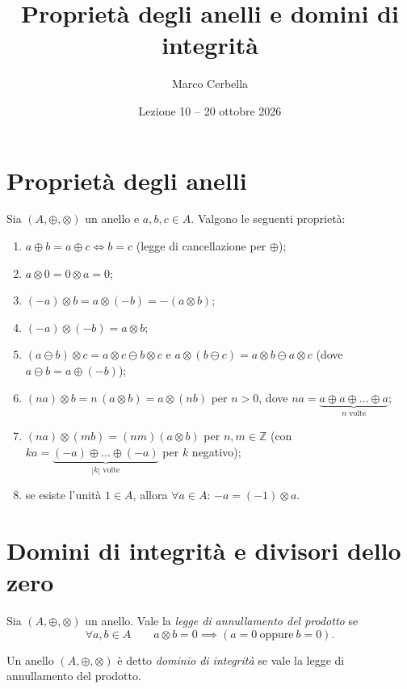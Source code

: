\documentclass[11pt,a4paper]{article}
\title{Proprietà degli anelli e domini di integrità}
\author{Marco Cerbella}
\date{Lezione 10 -- 20 ottobre 2026}
\begin{document}
\maketitle

\section{Proprietà degli anelli}

Sia $(A, \oplus, \otimes)$ un anello e $a, b, c \in A$. Valgono le seguenti proprietà:
\begin{enumerate}
  \item $a \oplus b = a \oplus c \iff b = c$ (legge di cancellazione per $\oplus$);
  \item $a \otimes 0 = 0 \otimes a = 0$;
  \item $(-a)\otimes b = a \otimes (-b) = -(a \otimes b)$;
  \item $(-a)\otimes(-b) = a \otimes b$;
  \item $(a \ominus b)\otimes c = a \otimes c \ominus b \otimes c$ e $a \otimes (b \ominus c) = a \otimes b \ominus a \otimes c$ (dove $a \ominus b = a \oplus (-b)$);
  \item $(na)\otimes b = n\,(a \otimes b) = a \otimes (nb)$ per $n > 0$, dove $na = \underbrace{a \oplus a \oplus \dots \oplus a}_{n\text{ volte}}$;
  \item $(na)\otimes(mb) = (nm)(a \otimes b)$ per $n, m \in \mathbb{Z}$ (con $ka = \underbrace{(-a)\oplus\dots\oplus(-a)}_{|k|\text{ volte}}$ per $k$ negativo);
  \item se esiste l'unità $1 \in A$, allora $\forall a \in A$: $-a = (-1)\otimes a$.
\end{enumerate}

\section{Domini di integrità e divisori dello zero}

\begin{definizione}
Sia $(A, \oplus, \otimes)$ un anello. Vale la \emph{legge di annullamento del prodotto} se
\[
  \forall a, b \in A \qquad a \otimes b = 0 \implies (a = 0 \ \text{oppure}\ b = 0).
\]
\end{definizione}

\begin{definizione}
Un anello $(A, \oplus, \otimes)$ è detto \emph{dominio di integrità} se vale la legge di annullamento del prodotto.
\end{definizione}
\end{document}
